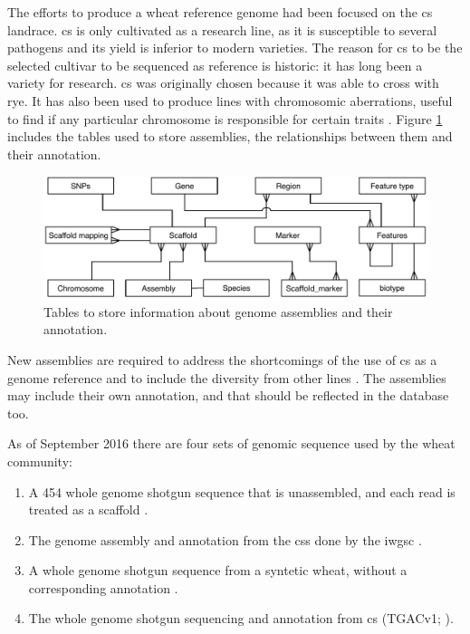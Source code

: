 The efforts to produce a wheat reference genome had been focused on the \gls{cs} landrace. 
\acrshort{cs} is only cultivated as a research line, as it is susceptible to several pathogens and its yield is inferior to modern varieties.  
The reason for \acrshort{cs} to be the selected cultivar to be sequenced as reference is historic: it has long been a variety  for research.
\acrshort{cs} was originally chosen because it was able to cross with rye. 
It has also been used to produce lines with chromosomic aberrations, useful to find if any particular chromosome is responsible for certain traits \citep{Sears1985}. 
Figure \ref{fig:discussion:assemblyTables} includes the tables used to store assemblies, the relationships between them and their annotation. 

\begin{figure}
\includegraphics[width=1\textwidth]{Conclusions/Figures/assemblyTables.pdf}
\caption{Tables to store information about genome assemblies and their annotation.}
\label{fig:discussion:assemblyTables}
\end{figure}

New assemblies are required to address the shortcomings of the use of \acrshort{cs} as a genome reference and to include the diversity from other lines \citep{Allen2016,Winfield2016}. 
The assemblies may include their own annotation, and that should be reflected in the database too. 

As of September 2016 there are four sets of genomic sequence used by the wheat community:
\begin{enumerate}
	\item  A 454 whole genome shotgun sequence that is unassembled, and each read is treated as a scaffold \citep{Brenchley2012}.
	\item The genome assembly and annotation from the \gls{css} done by the \acrshort{iwgsc} \citep{Mayer2014}.
	\item A whole genome shotgun sequence from a syntetic wheat, without a corresponding annotation \citep{Chapman2015}.
	\item The whole genome shotgun sequencing and annotation from \acrshort{cs} (TGACv1; \citealt{Clark2016}).
\end{enumerate}

